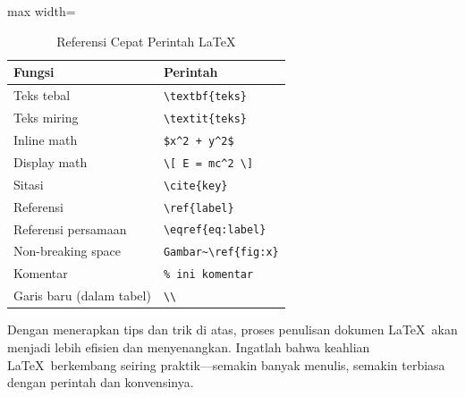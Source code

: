 \begin{table}[h]
  \centering
  \caption{Referensi Cepat Perintah \LaTeX}
  \begin{adjustbox}{max width=\textwidth}
  \begin{tabular}{ll}
    \toprule
    \textbf{Fungsi} & \textbf{Perintah} \\
    \midrule
    Teks tebal & \verb|\textbf{teks}| \\
    Teks miring & \verb|\textit{teks}| \\
    Inline math & \verb|$x^2 + y^2$| \\
    Display math & \verb|\[ E = mc^2 \]| \\
    Sitasi & \verb|\cite{key}| \\
    Referensi & \verb|\ref{label}| \\
    Referensi persamaan & \verb|\eqref{eq:label}| \\
    Non-breaking space & \verb|Gambar~\ref{fig:x}| \\
    Komentar & \verb|% ini komentar| \\
    Garis baru (dalam tabel) & \verb|\\| \\
    \bottomrule
  \end{tabular}
  \end{adjustbox}
\end{table}

Dengan menerapkan tips dan trik di atas, proses penulisan dokumen \LaTeX\ akan menjadi lebih efisien dan menyenangkan. Ingatlah bahwa keahlian \LaTeX\ berkembang seiring praktik—semakin banyak menulis, semakin terbiasa dengan perintah dan konvensinya.